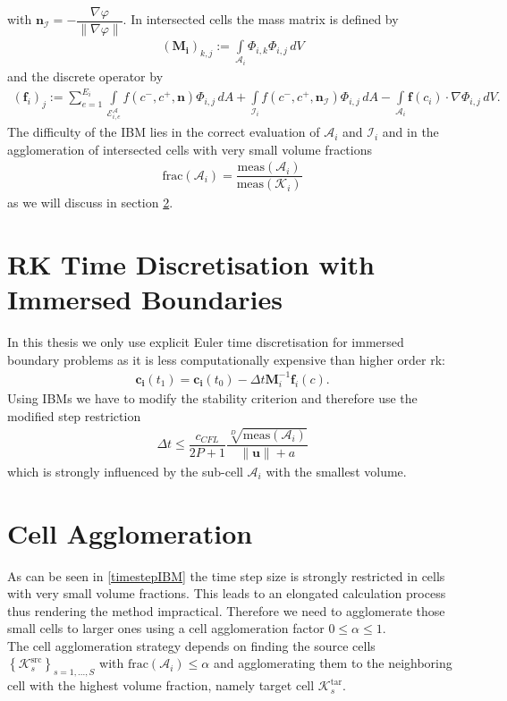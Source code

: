 	with $\mathbf{n}_\mathcal{I} = - \dfrac{\nabla\varphi}{\| \nabla\varphi \|}$.
	In intersected cells the mass matrix is defined by
	\begin{align}
		(\mathbf{M_i})_{k,j} := \int\limits_{\mathcal{A}_i}\Phi_{i,k}\Phi_{i,j}\, dV
	\end{align}
	and the discrete operator by
	\begin{align}
		(\mathbf{f}_i)_j := \sum_{e=1}^{E_i}\int\limits_{\mathcal{E}_{i,e}^\mathcal{A}} f \left( c^-, c^+, \mathbf{n} \right) \Phi_{i,j} \, dA + \int\limits_{\mathcal{I}_{i}} f \left( c^-, c^+, \mathbf{n}_\mathcal{I} \right) \Phi_{i,j} \, dA - \int\limits_{\mathcal{A}_i} \boldsymbol{f}\left(c_i\right) \cdot \nabla\Phi_{i,j} \, dV.
	\end{align}
	The difficulty of the IBM lies in the correct evaluation of $\mathcal{A}_i$ and $\mathcal{I}_i$ and in the agglomeration of intersected cells with very small volume fractions 
	\begin{align}
		\text{frac}(\mathcal{A}_i) = \dfrac{\text{meas}(\mathcal{A}_i)}{\text{meas}(\mathcal{K}_i)}
	\end{align} 
	as we will discuss in section \ref{cellAgglomeration}.
	
	\section{RK Time Discretisation with Immersed Boundaries}
	In this thesis we only use explicit Euler time discretisation for immersed boundary problems as it is less computationally expensive than higher order \gls{rk}:
	\begin{align}
		\mathbf{c_i}(t_1) = \mathbf{c_i}(t_0)-\Delta t \mathbf{M}_i^{-1} \mathbf{f}_i (c).
	\end{align}
	Using IBMs we have to modify the stability criterion and therefore use the modified step restriction
	\begin{align}
		\Delta t \leq \dfrac{c_{CFL}}{2P+1} \dfrac{\sqrt[D]{\text{meas}(\mathcal{A}_i)}}{\|\mathbf{u} \| + a}
		\label{timestepIBM}
	\end{align}
	which is strongly influenced by the sub-cell $\mathcal{A}_i$ with the smallest volume.
	
	\section{Cell Agglomeration}
	\label{cellAgglomeration}
	As can be seen in \ref{timestepIBM} the time step size is strongly restricted in cells with very small volume fractions. This leads to an elongated calculation process thus rendering the method impractical. Therefore we need to agglomerate those small cells to larger ones using a cell agglomeration factor $0 \leq \alpha \leq 1$. \\
	The cell agglomeration strategy depends on finding the source cells $\left\{\mathcal{K}_s^\text{src} \right\}_{s=1,...,S}$ with $\text{frac}(\mathcal{A}_i) \leq \alpha$ and agglomerating them to the neighboring cell with the highest volume fraction, namely target cell $\mathcal{K}_s^\text{tar}$.\\
	
